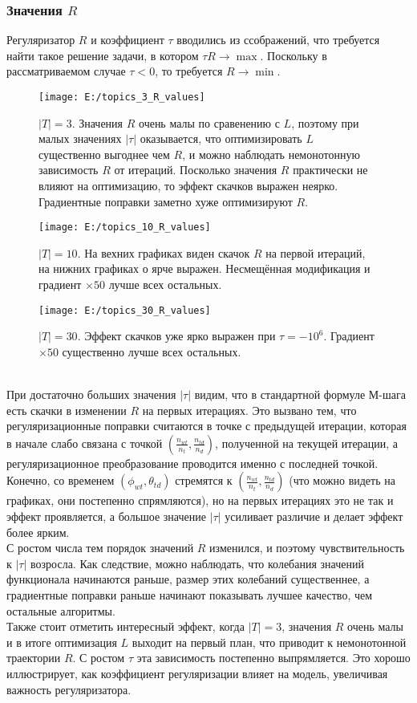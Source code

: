 \documentclass[12pt]{article}
\begin{document}
\subsubsection{Значения $R$}
Регуляризатор $R$ и коэффициент $\tau$  вводились из ссображений, что требуется найти такое решение задачи, в котором $\tau R \to \max$. Поскольку в рассматриваемом случае $\tau < 0$, то требуется $R \to \min$.\\
\begin{figure}[H]
	\centering
	\caption{$|T| = 3$. Значения $R$ очень малы по сравенению с $L$, поэтому при малых значениях $|\tau|$ оказывается, что оптимизировать $L$ существенно выгоднее чем $R$, и можно наблюдать немонотонную зависимость $R$ от итераций. Посколько значения $R$ практически не влияют на оптимизацию, то эффект скачков выражен неярко. Градиентные поправки заметно хуже оптимизируют $R$.}    
	\medskip
	\texttt{[image: E:/topics\_3\_R\_values]}
\end{figure}
\begin{figure}[H]
	\centering
	\caption{$|T| = 10$. На вехних графиках виден скачок $R$ на первой итераций, на нижних графиках о ярче выражен. Несмещённая модификация и градиент $\times 50$  лучше всех остальных.}    
	\texttt{[image: E:/topics\_10\_R\_values]}
\end{figure}
\begin{figure}[H]
	\centering
	\caption{$|T| = 30$. Эффект скачков уже ярко выражен при $\tau = -10^6$. Градиент $\times 50$ существенно лучше всех остальных.}    
	\texttt{[image: E:/topics\_30\_R\_values]}
\end{figure}
\ \\
При достаточно больших значения $|\tau|$ видим, что в стандартной  формуле М-шага есть скачки в изменении $R$ на первых итерациях. Это вызвано тем, что регуляризационные поправки считаются в точке с предыдущей итерации, которая в начале слабо связана с точкой $\left( \frac{n_{wt}}{{n_t}}, \frac{n_{td}}{n_d}\right)$, полученной на текущей итерации, а регуляризационное преобразование проводится именно с последней точкой. Конечно, со временем $(\phi_{wt}, \theta_{td})$ стремятся к $\left( \frac{n_{wt}}{{n_t}}, \frac{n_{td}}{n_d}\right)$ (что можно видеть на графиках, они постепенно спрямляются), но на первых итерациях это не так и эффект проявляется, а большое значение $|\tau|$ усиливает различие и делает эффект более ярким.\\
С ростом числа тем порядок значений $R$ изменился, и поэтому чувствительность к $|\tau|$ возросла. Как следствие, можно наблюдать, что колебания значений функционала начинаются раньше, размер этих колебаний существеннее, а градиентные поправки раньше начинают показывать лучшее качество, чем остальные алгоритмы.\\
Также стоит отметить интересный эффект, когда $|T| = 3$, значения $R$ очень малы и в итоге оптимизация $L$ выходит на первый план, что приводит к немонотонной траектории $R$. С ростом $\tau$ эта зависимость постепенно выпрямляется. Это хорошо иллюстрирует, как коэффициент регуляризации влияет на модель, увеличивая важность регуляризатора.
\end{document}
